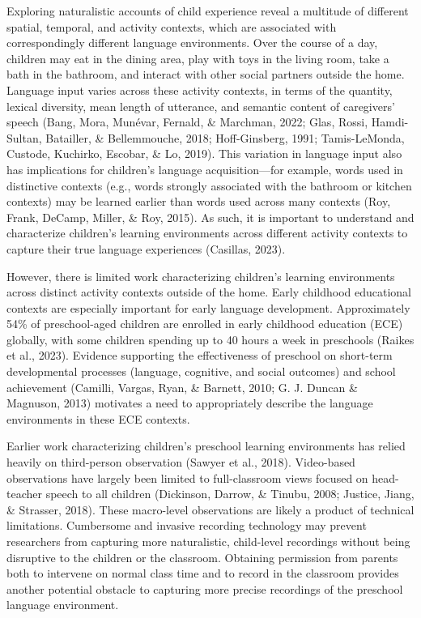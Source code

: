 \documentclass[10pt, letterpaper]{article}
\begin{document}
Exploring naturalistic accounts of child experience reveal a multitude
of different spatial, temporal, and activity contexts, which are
associated with correspondingly different language environments. Over
the course of a day, children may eat in the dining area, play with toys
in the living room, take a bath in the bathroom, and interact with other
social partners outside the home. Language input varies across these
activity contexts, in terms of the quantity, lexical diversity, mean
length of utterance, and semantic content of caregivers' speech (Bang,
Mora, Munévar, Fernald, \& Marchman, 2022; Glas, Rossi, Hamdi-Sultan,
Batailler, \& Bellemmouche, 2018; Hoff-Ginsberg, 1991; Tamis-LeMonda,
Custode, Kuchirko, Escobar, \& Lo, 2019). This variation in language
input also has implications for children's language acquisition---for
example, words used in distinctive contexts (e.g., words strongly
associated with the bathroom or kitchen contexts) may be learned earlier
than words used across many contexts (Roy, Frank, DeCamp, Miller, \&
Roy, 2015). As such, it is important to understand and characterize
children's learning environments across different activity contexts to
capture their true language experiences (Casillas, 2023).

However, there is limited work characterizing children's learning
environments across distinct activity contexts outside of the home.
Early childhood educational contexts are especially important for early
language development. Approximately 54\% of preschool-aged children are
enrolled in early childhood education (ECE) globally, with some children
spending up to 40 hours a week in preschools (Raikes et al., 2023).
Evidence supporting the effectiveness of preschool on short-term
developmental processes (language, cognitive, and social outcomes) and
school achievement (Camilli, Vargas, Ryan, \& Barnett, 2010; G. J.
Duncan \& Magnuson, 2013) motivates a need to appropriately describe the
language environments in these ECE contexts.

Earlier work characterizing children's preschool learning environments
has relied heavily on third-person observation (Sawyer et al., 2018).
Video-based observations have largely been limited to full-classroom
views focused on head-teacher speech to all children (Dickinson, Darrow,
\& Tinubu, 2008; Justice, Jiang, \& Strasser, 2018). These macro-level
observations are likely a product of technical limitations. Cumbersome
and invasive recording technology may prevent researchers from capturing
more naturalistic, child-level recordings without being disruptive to
the children or the classroom. Obtaining permission from parents both to
intervene on normal class time and to record in the classroom provides
another potential obstacle to capturing more precise recordings of the
preschool language environment.
\end{document}
